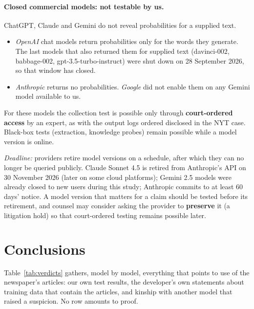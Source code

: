 \documentclass[10pt,a4paper]{article}
\begin{document}
\paragraph{Closed commercial models: not testable by us.} ChatGPT, Claude and Gemini do not reveal probabilities for
a supplied text.
\begin{itemize}
\item \emph{OpenAI} chat models return probabilities only for the words they generate. The last models that also
returned them for supplied text (davinci-002, babbage-002, gpt-3.5-turbo-instruct) were shut down on 28 September
2026, so that window has closed.
\item \emph{Anthropic} returns no probabilities. \emph{Google} did not enable them on any Gemini model available to us.
\end{itemize}
For these models the collection test is possible only through \textbf{court-ordered access} by an expert, as with
the output logs ordered disclosed in the NYT case. Black-box tests (extraction, knowledge probes) remain possible
while a model version is online.

\emph{Deadline:} providers retire model versions on a schedule, after which they can no longer be queried publicly.
Claude Sonnet 4.5 is retired from Anthropic's API on 30 November 2026 (later on some cloud platforms); Gemini 2.5
models were already closed to new users during this study; Anthropic commits to at least 60 days' notice. A model
version that matters for a claim should be tested before its retirement, and counsel may consider asking the
provider to \textbf{preserve} it (a litigation hold) so that court-ordered testing remains possible later.

\section{Conclusions}
Table~\ref{tab:verdicts} gathers, model by model, everything that points to use of the newspaper's articles: our own
test results, the developer's own statements about training data that contain the articles, and kinship with another
model that raised a suspicion. No row amounts to proof.
\end{document}
